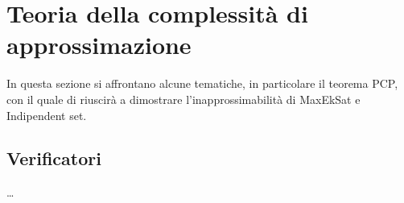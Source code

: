 \section{Teoria della complessità di approssimazione}

In questa sezione si affrontano alcune tematiche, in particolare il teorema PCP, 
con il quale di riuscirà a dimostrare l'inapprossimabilità di MaxEkSat e Indipendent set.

\subsection{Verificatori}
\dots









